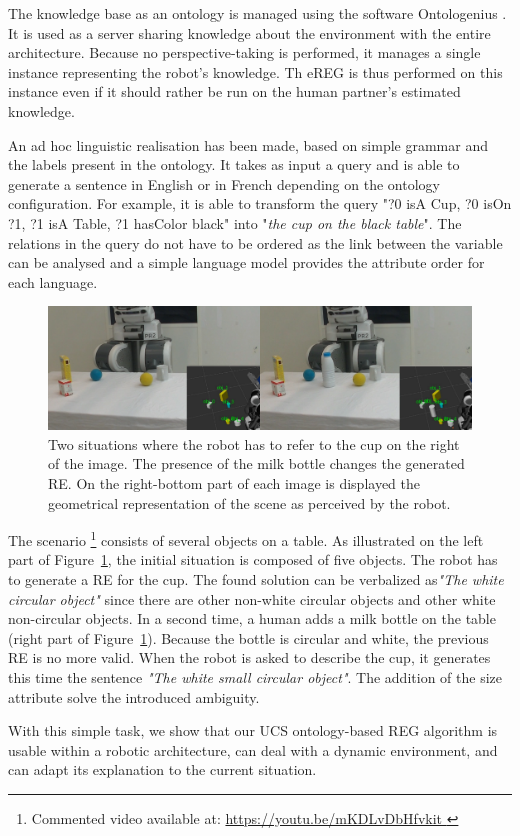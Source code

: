 The knowledge base as an ontology is managed using the software Ontologenius \cite{sarthou_2019_ontologenius}. It is used as a server sharing knowledge about the environment with the entire architecture. Because no perspective-taking is performed, it manages a single instance representing the robot's knowledge. Th eREG is thus performed on this instance even if it should rather be run on the human partner's estimated knowledge.

An ad hoc linguistic realisation has been made, based on simple grammar and the labels present in the ontology. It takes as input a \sparql{} query and is able to generate a sentence in English or in French depending on the ontology configuration. For example, it is able to transform the query "?0 isA Cup, ?0 isOn ?1, ?1 isA Table, ?1 hasColor black" into "\textit{the cup on the black table}". The relations in the query do not have to be ordered as the link between the variable can be analysed and a simple language model provides the attribute order for each language.

\begin{figure}[h!]
\centering
\includegraphics[width=\textwidth]{figures/chapter4/pr2.png}
\caption{\label{fig:chap4_pr2} Two situations where the robot has to refer to the cup on the right of the image. The presence of the milk bottle changes the generated RE. On the right-bottom part of each image is displayed the geometrical representation of the scene as perceived by the robot.}
\end{figure}

The scenario \footnote{Commented video available at: \url{https://youtu.be/mKDLvDbHfvkit }} consists of several objects on a table. As illustrated on the left part of Figure~\ref{fig:chap4_pr2}, the initial situation is composed of five objects. The robot has to generate a RE for the cup. The found solution can be verbalized as\textit{"The white circular object"} since there are other non-white circular objects and other white non-circular objects. In a second time, a human adds a milk bottle on the table (right part of Figure~\ref{fig:chap4_pr2}). Because the bottle is circular and white, the previous RE is no more valid. When the robot is asked to describe the cup, it generates this time the sentence \textit{"The white small circular object"}. The addition of the size attribute solve the introduced ambiguity.

With this simple task, we show that our UCS ontology-based REG algorithm is usable within a robotic architecture, can deal with a dynamic environment, and can adapt its explanation to the current situation.
